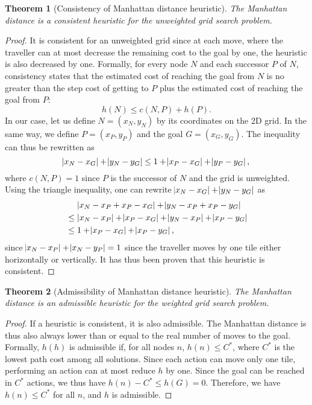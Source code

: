 \documentclass[journal]{IEEEtran}
\newtheorem{theorem}{Theorem}
\begin{document}
\begin{theorem}[Consistency of Manhattan distance heuristic]
	\label{thm:cons}
	The Manhattan distance is a consistent heuristic for the unweighted grid search problem.
\end{theorem}
\begin{proof}
It is consistent for an unweighted grid since at each move, where the traveller can at most decrease the remaining cost to the goal by one, the heuristic is also decreased by one.
Formally, for every node $N$ and each successor $P$ of $N$, consistency states that the estimated cost of reaching the goal from $N$ is no greater than the step cost of getting to $P$ plus the estimated cost of reaching the goal from $P$:
\[
 h(N) \le c(N,P) + h(P).
\]
In our case, let us define $N = (x_N, y_N)$ by its coordinates on the 2D grid.
In the same way, we define $P = (x_P, y_P)$ and the goal $G = (x_G, y_G)$. The inequality can thus be rewritten as
\[
 \abs{x_N - x_G} + \abs{y_N - y_G} \le 1 + \abs{x_P - x_G} + \abs{y_P - y_G},
\]
where $c(N,P) = 1$ since $P$ is the successor of $N$ and the grid is unweighted.
Using the triangle inequality, one can rewrite $\abs{x_N - x_G} + \abs{y_N - y_G}$ as 
\begin{align*}
   & \abs{x_N - x_P + x_P - x_G} + \abs{y_N - x_P + x_P - y_G} \\
  {}\le{}& \abs{x_N - x_P} + \abs{x_P - x_G} + \abs{y_N - x_P} + \abs{x_P - y_G} \\
  {}\le{}& 1 + \abs{x_P - x_G} + \abs{x_P - y_G},
\end{align*}
since $\abs{x_N - x_P} + \abs{x_N - y_P} = 1$ since the traveller moves by one tile either horizontally or vertically.
It has thus been proven that this heuristic is consistent.
\end{proof}
\begin{theorem}[Admissibility of Manhattan distance heuristic]
	\label{thm:admiss}
	The Manhattan distance is an admissible heuristic for the weighted grid search problem.
\end{theorem}
\begin{proof}
If a heuristic is consistent, it is also admissible.
The Manhattan distance is thus also always lower than or equal to the real number of moves to the goal.
Formally, $h(h)$ is admissible if, for all nodes $n$, $h(n) \le C^*$, where $C^*$ is the lowest path cost among all solutions.
Since each action can move only one tile, performing an action can at most reduce $h$ by one.
Since the goal can be reached in $C^*$ actions, we thus have $h(n) - C^* \le h(G) = 0$. Therefore, we have $h(n) \le C^*$ for all $n$, and $h$ is admissible.
\end{proof}
\end{document}
